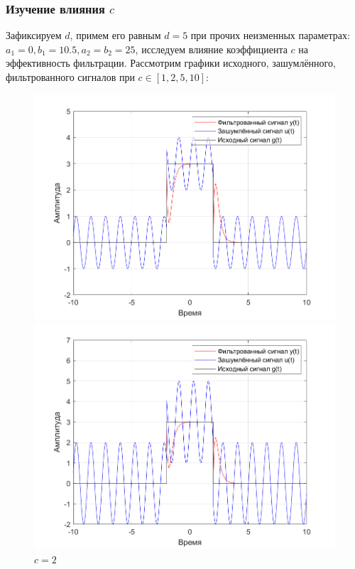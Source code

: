 \documentclass[a4paper]{article}
\begin{document}
\subsubsection{Изучение влияния $c$}

Зафиксируем $d$, примем его равным $d = 5$ при прочих неизменных параметрах: $a_1 = 0, b_1 = 10.5, a_2 = b_2 = 25$, исследуем влияние коэффициента $c$ на эффективность фильтрации. Рассмотрим графики исходного, зашумлённого, фильтрованного сигналов при $c \in [1, 2, 5, 10]$:

\begin{figure}[H]
    \begin{minipage}{0.5\textwidth}
        \centering
        \includegraphics[width=\linewidth]{ex1_2/a1=0_a2=25_b1=10.5_b2=25_d=5_c=1/h2.png}
        \caption{$c=1$}
    \end{minipage}
    \begin{minipage}{0.5\textwidth}
        \centering
        \includegraphics[width=\linewidth]{ex1_2/a1=0_a2=25_b1=10.5_b2=25_d=5_c=2/h2.png}
        \caption{$c=2$}
    \end{minipage}
\end{figure}
\end{document}
